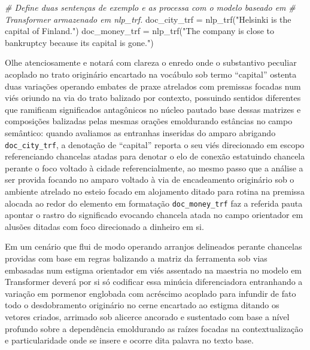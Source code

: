 \documentclass[
  brazilian,
]{article}
\newenvironment{Shaded}{}{}
\newcommand{\CommentTok}[1]{\textcolor[rgb]{0.38,0.63,0.69}{\textit{#1}}}
\newcommand{\NormalTok}[1]{#1}
\newcommand{\OperatorTok}[1]{\textcolor[rgb]{0.40,0.40,0.40}{#1}}
\newcommand{\StringTok}[1]{\textcolor[rgb]{0.25,0.44,0.63}{#1}}
\begin{document}
\begin{Shaded}
\begin{Highlighting}[]
\CommentTok{\# Define duas sentenças de exemplo e as processa com o modelo baseado em}
\CommentTok{\# Transformer armazenado em \textquotesingle{}nlp\_trf\textquotesingle{}.}
\NormalTok{doc\_city\_trf }\OperatorTok{=}\NormalTok{ nlp\_trf(}\StringTok{"Helsinki is the capital of Finland."}\NormalTok{)}
\NormalTok{doc\_money\_trf }\OperatorTok{=}\NormalTok{ nlp\_trf(}\StringTok{"The company is close to bankruptcy because its capital is gone."}\NormalTok{)}
\end{Highlighting}
\end{Shaded}

Olhe atenciosamente e notará com clareza o enredo onde o substantivo
peculiar acoplado no trato originário encartado na vocábulo sob termo
``capital'' ostenta duas variações operando embates de praxe atrelados
com premissas focadas num viés oriundo na via do trato balizado por
contexto, possuindo sentidos diferentes que ramificam significados
antagônicos no núcleo pautado base dessas matrizes e composições
balizadas pelas mesmas orações emoldurando estâncias no campo semântico:
quando avaliamos as entranhas inseridas do amparo abrigando
\texttt{doc\_city\_trf}, a denotação de ``capital'' reporta o seu viés
direcionado em escopo referenciando chancelas atadas para denotar o elo
de conexão estatuindo chancela perante o foco voltado à cidade
referencialmente, ao mesmo passo que a análise a ser provida focando no
amparo voltado à via de encadeamento originário sob o ambiente atrelado
no esteio focado em alojamento ditado para rotina na premissa alocada ao
redor do elemento em formatação \texttt{doc\_money\_trf} faz a referida
pauta apontar o rastro do significado evocando chancela atada no campo
orientador em alusões ditadas com foco direcionado a dinheiro em si.

Em um cenário que flui de modo operando arranjos delineados perante
chancelas providas com base em regras balizando a matriz da ferramenta
sob vias embasadas num estigma orientador em viés assentado na maestria
no modelo em Transformer deverá por si só codificar essa minúcia
diferenciadora entranhando a variação em pormenor englobada com
acréscimo acoplado para infundir de fato todo o desdobramento originário
no cerne encartado ao estigma ditando os vetores criados, arrimado sob
alicerce ancorado e sustentado com base a nível profundo sobre a
dependência emoldurando as raízes focadas na contextualização e
particularidade onde se insere e ocorre dita palavra no texto base.
\end{document}
